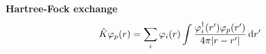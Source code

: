 \begin{frame}
\begin{columns}
    \begin{column}[b]{0.5\textwidth}
      \centering
      \textbf{Hartree-Fock exchange}
      \begin{equation}
        \nonumber
        \hat{K}\varphi_p(r) = \sum_i \varphi_i(r) \int \frac{\varphi_i^\dagger(r')\varphi_p(r')}{4\pi|r-r'|} \,\mathrm{d} r'
      \end{equation}
    \end{column}
  \end{columns}
\end{frame}

%
%
%
%
%
%
